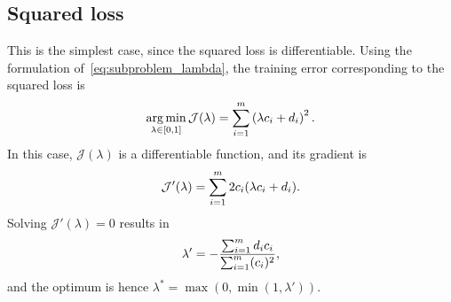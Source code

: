 \subsection{Squared loss}
This is the simplest case, since the squared loss is differentiable.
Using the formulation of~\eqref{eq:subproblem_lambda}, the training error corresponding to the squared loss is
\begin{equation}
    \label{eq:opt_sq}
    \argmin_{\lambda \in [0, 1]} \mathcal{J}(\lambda) = \sum_{i=1}^{\npertask} \left({\lambda c_i + d_i}\right)^2 .
\end{equation}
In this case, $\mathcal{J}(\lambda)$ is a differentiable function, and its gradient is 
\begin{equation}
    \nonumber
    \mathcal{J}'(\lambda) = \sum_{i=1}^m 2 c_i (\lambda c_i + d_i) .
\end{equation}
Solving $\mathcal{J}'(\lambda)= 0$ results in
%
\begin{equation*}
\lambda' =  -\frac{\sum_{i=1}^{m} d_i c_i }{\sum_{i=1}^{m} (c_i)^2 } ,
\end{equation*}
and the optimum is hence $\lambda^* = \max(0, \min(1, \lambda'))$.

